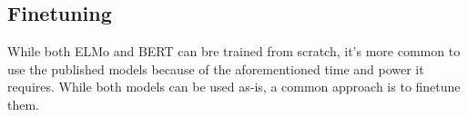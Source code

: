 \documentclass{report}
\begin{document}
\subsection{Finetuning}
While both ELMo and BERT can bre trained from scratch, it's more common to use the published models because of the aforementioned time and power it requires. While both models can be used as-is, a common approach is to finetune them.






\newpage


\end{document}
